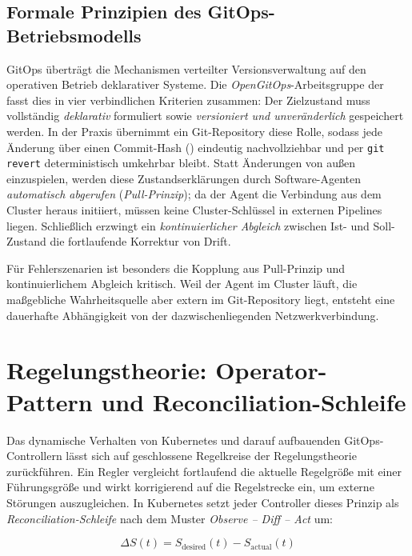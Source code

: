 \subsection{Formale Prinzipien des GitOps-Betriebsmodells}
\label{subsec:formale-prinzipien-gitops}

GitOps überträgt die Mechanismen verteilter Versionsverwaltung auf den operativen Betrieb deklarativer Systeme. Die \textit{OpenGitOps}-Arbeitsgruppe der  fasst dies in vier verbindlichen Kriterien zusammen:\autocite{opengitops_principles_2021} Der Zielzustand muss vollständig \textit{deklarativ} formuliert sowie \textit{versioniert und unveränderlich} gespeichert werden. In der Praxis übernimmt ein Git-Repository diese Rolle, sodass jede Änderung über einen Commit-Hash () eindeutig nachvollziehbar und per \texttt{git revert} deterministisch umkehrbar bleibt. Statt Änderungen von außen einzuspielen, werden diese Zustandserklärungen durch Software-Agenten \textit{automatisch abgerufen} (\textit{Pull-Prinzip}); da der Agent die Verbindung aus dem Cluster heraus initiiert, müssen keine Cluster-Schlüssel in externen Pipelines liegen.\autocite{beetz_gitops_2022} Schließlich erzwingt ein \textit{kontinuierlicher Abgleich} zwischen Ist- und Soll-Zustand die fortlaufende Korrektur von Drift.

Für Fehlerszenarien ist besonders die Kopplung aus Pull-Prinzip und kontinuierlichem Abgleich kritisch. Weil der Agent im Cluster läuft, die maßgebliche Wahrheitsquelle aber extern im Git-Repository liegt, entsteht eine dauerhafte Abhängigkeit von der dazwischenliegenden Netzwerkverbindung.

\section{Regelungstheorie: Operator-Pattern und Reconciliation-Schleife}
\label{sec:operator-pattern-reconciliation}

Das dynamische Verhalten von Kubernetes und darauf aufbauenden GitOps-Controllern lässt sich auf geschlossene Regelkreise der Regelungstheorie zurückführen.\autocite{lim_control_2009} Ein Regler vergleicht fortlaufend die aktuelle Regelgröße mit einer Führungsgröße und wirkt korrigierend auf die Regelstrecke ein, um externe Störungen auszugleichen. In Kubernetes setzt jeder Controller dieses Prinzip als \textit{Reconciliation-Schleife} nach dem Muster \textit{Observe -- Diff -- Act} um:\autocite[Kap.~9]{burns_kubernetes_2022}

\begin{equation}
\Delta S(t) = S_{\text{desired}}(t) - S_{\text{actual}}(t)
\label{eq:reconcile-diff}
\end{equation}


